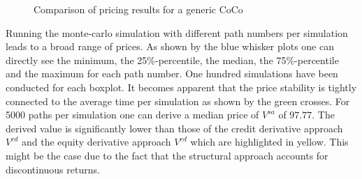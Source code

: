 \begin{figure}[H]
\caption[Comparison of pricing results for a generic CoCo]{Comparison of pricing results for a generic CoCo}
\label{fig:comparison}
\end{figure}

Running the monte-carlo simulation with different path numbers per simulation leads to a broad range of prices. As shown by the blue whisker plots one can directly see the minimum, the 25\%-percentile, the median, the 75\%-percentile and the maximum for each path number. One hundred simulations have been conducted for each boxplot. It becomes apparent that the price stability is tightly connected to the average time per simulation as shown by the green crosses. For 5000 paths per simulation one can derive a median price of $V^{sa}$ of $97.77$. The derived value is significantly lower than those of the credit derivative approach $V^{cd}$ and the equity derivative approach $V^{ed}$ which are highlighted in yellow. This might be the case due to the fact that the structural approach accounts for discontinuous returns.


